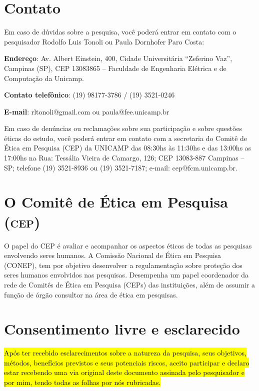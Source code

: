 \documentclass[a4paper,11pt,titlepage,singlespacing]{article}
\begin{document}
\section*{Contato}

Em caso de dúvidas sobre a pesquisa, você poderá entrar em contato com o pesquisador Rodolfo Luis Tonoli ou Paula Dornhofer Paro Costa:

\textbf{Endereço}: Av. Albert Einstein, 400, Cidade Universitária “Zeferino Vaz”, Campinas (SP), CEP
13083865 – Faculdade de Engenharia Elétrica e de Computação da Unicamp.

\textbf{Contato telefônico}: (19) 98177-3786 / (19) 3521-0246

\textbf{E-mail}: rltonoli@gmail.com ou paula@fee.unicamp.br

Em caso de denúncias ou reclamações sobre sua participação e sobre questões éticas do estudo,
você poderá entrar em contato com a secretaria do Comitê de Ética em Pesquisa (CEP) da UNICAMP das 08:30hs às 11:30hs e das 13:00hs as 17:00hs na Rua: Tessália Vieira de Camargo, 126; CEP 13083-887 Campinas – SP; telefone (19) 3521-8936 ou (19) 3521-7187; e-mail: cep@fcm.unicamp.br.

\section*{O Comitê de Ética em Pesquisa \textsc{(cep)}}

O papel do CEP é avaliar e acompanhar os aspectos éticos de todas as pesquisas envolvendo seres humanos. A Comissão Nacional de Ética em Pesquisa (CONEP), tem por objetivo desenvolver a regulamentação sobre proteção dos seres humanos
envolvidos nas pesquisas. Desempenha um papel coordenador da rede de Comitês de
Ética em Pesquisa (CEPs) das instituições, além de assumir a função de órgão
consultor na área de ética em pesquisas.
\vspace{10pt}

\section*{Consentimento livre e esclarecido}

\hl{Após ter recebido esclarecimentos sobre a natureza da pesquisa, seus objetivos, métodos, benefícios
previstos e seus potenciais riscos, aceito participar e declaro estar
recebendo uma via original deste documento assinada pelo pesquisador e por mim, tendo todas as folhas
por nós rubricadas.}
\end{document}
